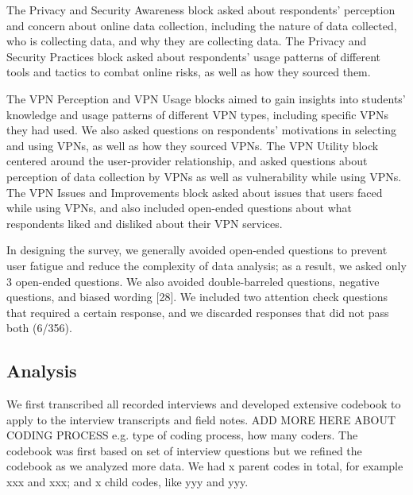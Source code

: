 The Privacy and Security Awareness block asked about respondents' perception
and concern about online data collection, including the nature of data
collected, who is collecting data, and why they are collecting data. The
Privacy and Security Practices block asked about respondents' usage patterns
of different tools and tactics to combat online risks, as well as how they
sourced them.

The VPN Perception and VPN Usage blocks aimed to gain insights into students’
knowledge and usage patterns of different VPN types, including specific VPNs
they had used. We also asked questions on respondents’ motivations in
selecting and using VPNs, as well as how they sourced VPNs. The VPN Utility
block centered around the user-provider relationship, and asked questions
about perception of data collection by VPNs as well as vulnerability while
using VPNs. The VPN Issues and Improvements block asked about issues that
users faced while using VPNs, and also included open-ended questions about
what respondents liked and disliked about their VPN services.

In designing the survey, we generally avoided open-ended questions to prevent
user fatigue and reduce the complexity of data analysis; as a result, we asked
only 3 open-ended questions. We also avoided double-barreled questions,
negative questions, and biased wording [28]. We included two attention check
questions that required a certain response, and we discarded responses that
did not pass both (6/356).


\subsection{Analysis} We first transcribed all recorded interviews and
developed extensive codebook to apply to the interview transcripts and field notes. ADD MORE HERE ABOUT CODING PROCESS e.g. type of coding process, how many coders. The
codebook was first based on set of interview questions but we refined the codebook as we analyzed more data. We had x parent codes in total,
for example xxx and xxx; and x child codes, like yyy and yyy.

